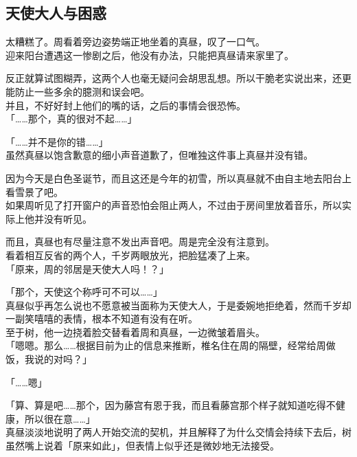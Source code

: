 \subsection{天使大人与困惑}

太糟糕了。周看着旁边姿势端正地坐着的真昼，叹了一口气。\\

迎来阳台遭遇这一惨剧之后，他没有办法，只能把真昼请来家里了。

反正就算试图糊弄，这两个人也毫无疑问会胡思乱想。所以干脆老实说出来，还更能防止一些多余的臆测和误会吧。\\

并且，不好好封上他们的嘴的话，之后的事情会很恐怖。\\

「……那个，真的很对不起……」

「……并不是你的错……」\\

虽然真昼以饱含歉意的细小声音道歉了，但唯独这件事上真昼并没有错。

因为今天是白色圣诞节，而且这还是今年的初雪，所以真昼就不由自主地去阳台上看雪景了吧。\\

如果周听见了打开窗户的声音恐怕会阻止两人，不过由于房间里放着音乐，所以实际上他并没有听见。

而且，真昼也有尽量注意不发出声音吧。周是完全没有注意到。\\

看着相互反省的两个人，千岁两眼放光，把脸猛凑了上来。\\

「原来，周的邻居是天使大人吗！？」

「那个，天使这个称呼可不可以……」\\

真昼似乎再怎么说也不愿意被当面称为天使大人，于是委婉地拒绝着，然而千岁却一副笑嘻嘻的表情，根本不知道有没有在听。\\

至于树，他一边挠着脸交替看着周和真昼，一边微皱着眉头。\\

「嗯嗯。那么……根据目前为止的信息来推断，椎名住在周的隔壁，经常给周做饭，我说的对吗？」

「……嗯」

「算、算是吧……那个，因为藤宫有恩于我，而且看藤宫那个样子就知道吃得不健康，所以很在意……」\\

真昼淡淡地说明了两人开始交流的契机，并且解释了为什么交情会持续下去后，树虽然嘴上说着「原来如此」，但表情上似乎还是微妙地无法接受。\\

